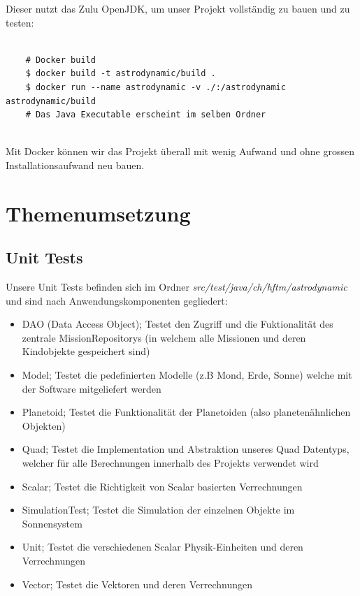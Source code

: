 Dieser nutzt das Zulu OpenJDK, um unser Projekt vollständig zu bauen und zu testen:

\begin{lstlisting}

	# Docker build
	$ docker build -t astrodynamic/build .
	$ docker run --name astrodynamic -v ./:/astrodynamic astrodynamic/build
	# Das Java Executable erscheint im selben Ordner
	
\end{lstlisting}

Mit Docker können wir das Projekt überall mit wenig Aufwand und ohne grossen Installationsaufwand neu bauen.

\section{Themenumsetzung}

\subsection{Unit Tests}

Unsere Unit Tests befinden sich im Ordner \textit{src/test/java/ch/hftm/astrodynamic} und sind nach Anwendungskomponenten gegliedert:

\begin{itemize}
	\item DAO (Data Access Object); Testet den Zugriff und die Fuktionalität des zentrale MissionRepositorys (in welchem alle Missionen und deren Kindobjekte gespeichert sind)
	\item Model; Testet die pedefinierten Modelle (z.B Mond, Erde, Sonne) welche mit der Software mitgeliefert werden
	\item Planetoid; Testet die Funktionalität der Planetoiden (also planetenähnlichen Objekten)
	\item Quad; Testet die Implementation und Abstraktion unseres Quad Datentyps, welcher für alle Berechnungen innerhalb des Projekts verwendet wird
	\item Scalar; Testet die Richtigkeit von Scalar basierten Verrechnungen
	\item SimulationTest; Testet die Simulation der einzelnen Objekte im Sonnensystem
	\item Unit; Testet die verschiedenen Scalar Physik-Einheiten und deren Verrechnungen
	\item Vector; Testet die Vektoren und deren Verrechnungen
\end{itemize}

